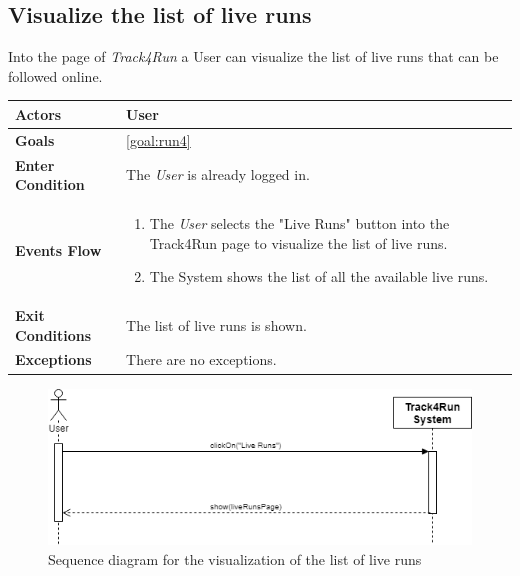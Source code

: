  \subsection{Visualize the list of live runs}
Into the page of \emph{Track4Run} a User can visualize the list of live runs that can be followed online.

\begin{table}[H]
	\centering
    
    \begin{tabular}{|p{3.5cm}|p{10.3cm}|}
    
    \hline
    \textbf{\large{Actors}} & User	 \\ 			
    \hline
    \textbf{\large{Goals}} 				& \ref{goal:run4}\\
    
    \hline
    \textbf{\large{Enter Condition}}	& The \emph{User} is already logged in.		\\
    
    \hline
    \textbf{\large{Events Flow}}		& \begin{enumerate}[leftmargin=0.5cm]
                                          	\item The \emph{User} selects the "Live Runs" button into the Track4Run page to visualize the list of live runs.
                                          	 \item The System shows the list of all the available live runs.
                                          \end{enumerate}
    										\\
    \hline
    \textbf{\large{Exit Conditions}}    & The list of live runs is shown.\\
    
    \hline
    \textbf{\large{Exceptions}} 		& There are no exceptions.\\
    
    \hline
    
    
    \end{tabular}
	
\end{table}

\begin{figure}[H]
    \centering
    \includegraphics[scale=0.4]{Pictures/visListLiveRunsSeqDiag.png}
    \caption{Sequence diagram for the visualization of the list of live runs}
\end{figure}
